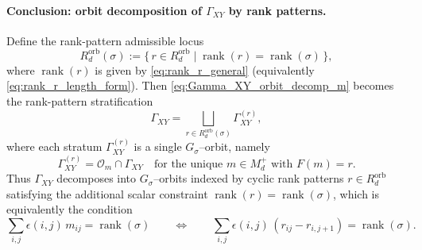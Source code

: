 \documentclass{article}
\newcommand{\rank}{\operatorname{rank}}
\theoremstyle{definition}
\begin{document}
\paragraph{Conclusion: orbit decomposition of $\Gamma_{XY}$ by rank patterns.}
Define the rank-pattern admissible locus
\[
R_d^{\mathrm{orb}}(\sigma)
:=
\{\, r\in R_d^{\mathrm{orb}} \mid \rank(r)=\rank(\sigma)\,\},
\]
where $\rank(r)$ is given by \eqref{eq:rank_r_general} (equivalently \eqref{eq:rank_r_length_form}).
Then \eqref{eq:Gamma_XY_orbit_decomp_m} becomes the rank-pattern stratification
\begin{equation}\label{eq:Gamma_XY_orbit_decomp_r}
\Gamma_{XY}
=
\bigsqcup_{r\in R_d^{\mathrm{orb}}(\sigma)}
\Gamma_{XY}^{(r)},
\end{equation}
where each stratum $\Gamma_{XY}^{(r)}$ is a single $G_\sigma$--orbit, namely
\[
\Gamma_{XY}^{(r)}=\mathcal O_m\cap \Gamma_{XY}
\quad\text{for the unique }m\in M_d^+\text{ with }F(m)=r.
\]
Thus $\Gamma_{XY}$ decomposes into $G_\sigma$--orbits indexed by cyclic rank patterns
$r\in R_d^{\mathrm{orb}}$ satisfying the additional scalar constraint
$\rank(r)=\rank(\sigma)$, which is equivalently the condition
\[
\sum_{i,j}\epsilon(i,j)\,m_{ij}=\rank(\sigma)
\qquad\Longleftrightarrow\qquad
\sum_{i,j}\epsilon(i,j)\,(r_{ij}-r_{i,j+1})=\rank(\sigma).
\]
\end{document}
